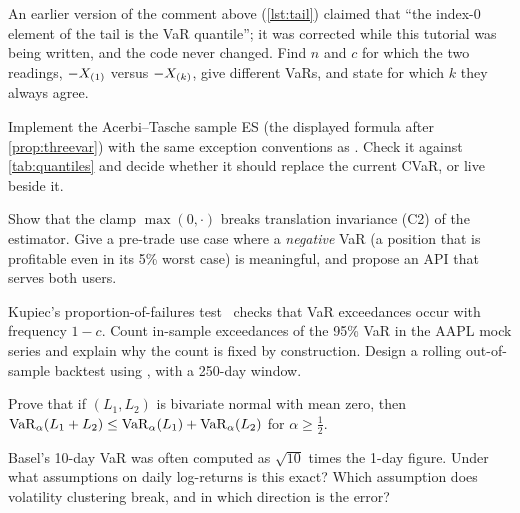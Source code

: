 \begin{exercises}
 An earlier version of the comment above  (\cref{lst:tail}) claimed that
``the index-0 element of the tail is the VaR quantile''; it was corrected while this tutorial was being written, and the
code never changed. Find $n$ and $c$ for which the two readings, $-X_{(1)}$ versus $-X_{(k)}$, give different VaRs, and
state for which $k$ they always agree.

 Implement the Acerbi--Tasche sample ES (the displayed formula after \cref{prop:threevar}) with the same
exception conventions as . Check it against \cref{tab:quantiles} and decide whether it should
replace the current CVaR, or live beside it.

 Show that the clamp $\max(0,\cdot)$ breaks translation invariance (C2) of the estimator. Give a
pre-trade use case where a \emph{negative} VaR (a position that is profitable even in its 5\% worst case) is meaningful,
and propose an API that serves both users.

 Kupiec's proportion-of-failures test~\cite{kupiec1995techniques} checks that VaR exceedances occur
with frequency $1-c$. Count in-sample exceedances of the 95\% VaR in the AAPL mock series and explain why the count is
fixed by construction. Design a rolling out-of-sample backtest using , with a 250-day window.

 Prove that if $(L_1,L_2)$ is bivariate normal with mean zero, then
$\mathrm{VaR}_\alpha(L_1+L_2)\le\mathrm{VaR}_\alpha(L_1)+\mathrm{VaR}_\alpha(L_2)$ for $\alpha\ge\frac12$.

 Basel's 10-day VaR was often computed as $\sqrt{10}$ times the 1-day figure. Under what assumptions on
daily log-returns is this exact? Which assumption does volatility clustering break, and in which direction is the error?
\end{exercises}

